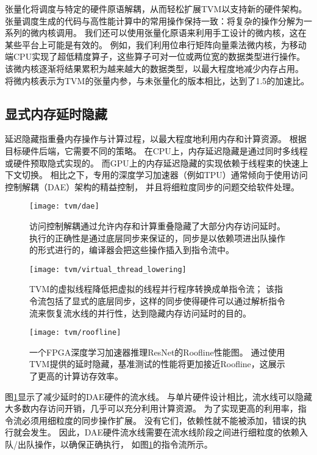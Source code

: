 张量化将调度与特定的硬件原语解耦，从而轻松扩展TVM以支持新的硬件架构。
张量调度生成的代码与高性能计算中的常用操作保持一致：将复杂的操作分解为一系列的微内核调用。
我们还可以使用张量化原语来利用手工设计的微内核，这在某些平台上可能是有效的。
例如，我们利用位串行矩阵向量乘法微内核，为移动端CPU实现了超低精度算子，这些算子可对一位或两位宽的数据类型进行操作。
该微内核逐渐将结果累积为越来越大的数据类型，以最大程度地减少内存占用。
将微内核表示为TVM的张量内参，与未张量化的版本相比，达到了1.5的加速比。

\subsection{显式内存延时隐藏}
延迟隐藏指重叠内存操作与计算过程，以最大程度地利用内存和计算资源。
根据目标硬件后端，它需要不同的策略。
在CPU上，内存延迟隐藏是通过同时多线程或硬件预取隐式实现的。
而GPU上的内存延迟隐藏的实现依赖于线程束的快速上下文切换。
相比之下，专用的深度学习加速器（例如TPU）通常倾向于使用访问控制解耦（DAE）架构的精益控制，
并且将细粒度同步的问题交给软件处理。

\begin{figure}[htbp]
    \centering
    \texttt{[image: tvm/dae]}
    \caption{\label{fig:dae}访问控制解耦通过允许内存和计算重叠隐藏了大部分内存访问延时。
    执行的正确性是通过底层同步来保证的，同步是以依赖项进出队操作的形式进行的，编译器会把这些操作插入到指令流中。}
\end{figure}

\begin{figure}[htbp]
    \centering
    \texttt{[image: tvm/virtual\_thread\_lowering]}
    \caption{\label{fig:virtual thread lowering}TVM的虚拟线程降低把虚拟的线程并行程序转换成单指令流；
    该指令流包括了显式的底层同步，这样的同步使得硬件可以通过解析指令流来恢复流水线的并行性，达到隐藏内存访问延时的目的。}
\end{figure}

\begin{figure}[htbp]
    \centering
    \texttt{[image: tvm/roofline]}
    \caption{\label{fig:roofline}一个FPGA深度学习加速器推理ResNet的Roofline性能图。
    通过使用TVM提供的延时隐藏，基准测试的性能将更加接近Roofline，这展示了更高的计算访存效率。}
\end{figure}

图\ref{fig:dae}显示了减少延时的DAE硬件的流水线。
与单片硬件设计相比，流水线可以隐藏大多数内存访问开销，几乎可以充分利用计算资源。
为了实现更高的利用率，指令流必须用细粒度的同步操作扩展。
没有它们，依赖性就不能被添加，错误的执行就会发生。
因此，DAE硬件流水线需要在流水线阶段之间进行细粒度的依赖入队/出队操作，以确保正确执行，
如图\ref{fig:dae}的指令流所示。

